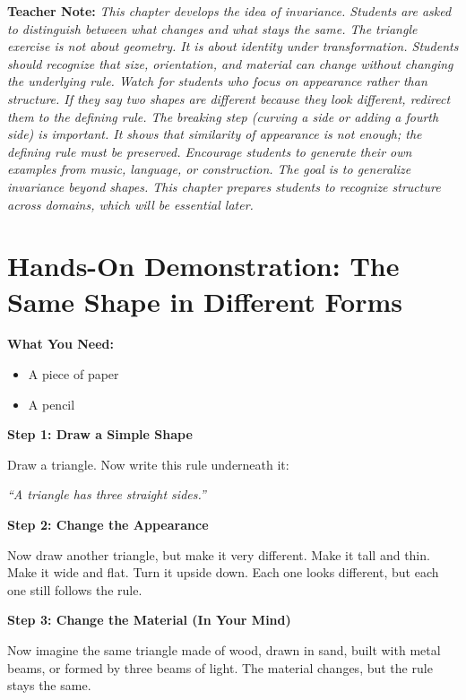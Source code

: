 \documentclass[12pt]{book}
\newenvironment{teachernote}
{\par\medskip\noindent\textbf{Teacher Note:} \itshape}
{\par\medskip}
\begin{document}
\begin{teachernote}
This chapter develops the idea of invariance. Students are asked to
distinguish between what changes and what stays the same. The triangle
exercise is not about geometry. It is about identity under transformation.
Students should recognize that size, orientation, and material can change
without changing the underlying rule. Watch for students who focus on
appearance rather than structure. If they say two shapes are different
because they look different, redirect them to the defining rule. The
breaking step (curving a side or adding a fourth side) is important. It
shows that similarity of appearance is not enough; the defining rule must
be preserved. Encourage students to generate their own examples from
music, language, or construction. The goal is to generalize invariance
beyond shapes. This chapter prepares students to recognize structure
across domains, which will be essential later.
\end{teachernote}

\section*{Hands-On Demonstration: The Same Shape in Different Forms}

\textbf{What You Need:}
\begin{itemize}
  \item A piece of paper
  \item A pencil
\end{itemize}

\textbf{Step 1: Draw a Simple Shape}

Draw a triangle. Now write this rule underneath it:

\emph{``A triangle has three straight sides.''}

\textbf{Step 2: Change the Appearance}

Now draw another triangle, but make it very different. Make it tall and
thin. Make it wide and flat. Turn it upside down. Each one looks different,
but each one still follows the rule.

\textbf{Step 3: Change the Material (In Your Mind)}

Now imagine the same triangle made of wood, drawn in sand, built with
metal beams, or formed by three beams of light. The material changes,
but the rule stays the same.
\end{document}

